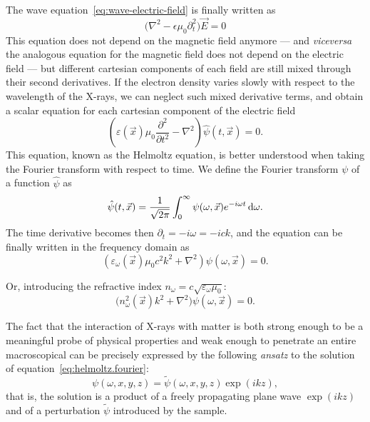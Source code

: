 The wave equation~\eqref{eq:wave-electric-field} is finally written as
\begin{equation}
    \big(\nabla^2 - \epsilon\mu_0\partial^2_t \big) \vec{E} = 0
\end{equation}
This equation does not depend on the magnetic field anymore --- and
\emph{viceversa} the analogous equation for the magnetic field does not
depend on the electric field --- but different cartesian components of each 
field are still mixed through their second derivatives. If the electron density varies slowly
with respect to the wavelength of the X-rays, we can neglect such mixed
derivative terms, and obtain a scalar equation for each cartesian component
of the electric field
\begin{equation}
    \left( \varepsilon(\vec{x}) \mu_0 \frac{\partial^2}{\partial t^2} - \nabla^2
    \right) \hat{\psi}(t, \vec{x}) = 0.\label{eq:helmoltz.spacetime}
\end{equation}
This equation, known as the Helmoltz equation, is better understood when
taking the Fourier transform with respect to time. We define the Fourier
transform $\psi$ of a function $\hat\psi$ as
\begin{equation}
    \hat{\psi}(t, \vec{x}) =
    \frac{1}{\sqrt{2\pi}}\int_{0}^{\infty}\psi(\omega, \vec{x})
    e^{-i \omega t} \operatorname{d}\!{\omega}.
\end{equation}
The time derivative becomes then $\partial_t = - i\omega = -i c k$, and the
equation can be finally written in the frequency domain as
\begin{equation}
    \left( \varepsilon_\omega(\vec{x}) \mu_0 c^2 k^2 + \nabla^2
    \right) \psi(\omega, \vec{x}) = 0.
\end{equation}

Or, introducing the refractive index $n_\omega =
c\sqrt{\varepsilon_\omega\mu_0}$:
\begin{equation}
    \big( n_\omega^2(\vec{x}) k^2 + \nabla^2
    \big) \psi(\omega, \vec{x}) = 0.\label{eq:helmoltz.fourier}
\end{equation}

The fact that the interaction of X-rays with matter is both strong enough to
be a meaningful probe of physical properties and weak enough to penetrate an
entire macroscopical can be precisely expressed by the following
\emph{ansatz} to the solution of equation~\eqref{eq:helmoltz.fourier}:
    \begin{equation*}
 \psi(\omega, x, y, z) = \tilde{\psi}(\omega, x, y, z) \exp(ikz),    
\end{equation*}
that is, the solution is a product of a freely propagating plane wave
$\exp(ikz)$ and of a perturbation $\tilde{\psi}$ introduced by the sample.

